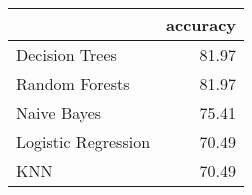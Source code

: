 \begin{tabular}{lr}
\toprule
{} &  accuracy \\
\midrule
Decision Trees      &     81.97 \\
Random Forests      &     81.97 \\
Naive Bayes         &     75.41 \\
Logistic Regression &     70.49 \\
KNN                 &     70.49 \\
\bottomrule
\end{tabular}


